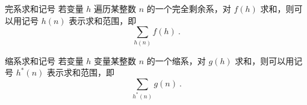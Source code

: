 
\begin{definition}{完系求和记号}
若变量 $h$ 遍历某整数 $n$ 的一个完全剩余系，对 $f(h)$ 求和，则可以用记号 $h(n)$ 表示求和范围，即
\begin{equation}
\sum_{h(n)} f(h) ~.
\end{equation}
\end{definition}

\begin{definition}{缩系求和记号}
若变量 $h$ 变量某整数 $n$ 的一个缩系，对 $g(h)$ 求和，则可以用记号 $h^*(n)$ 表示求和范围，即
\begin{equation}
\sum_{h^*(n)} g(n) ~.
\end{equation}

\end{definition}